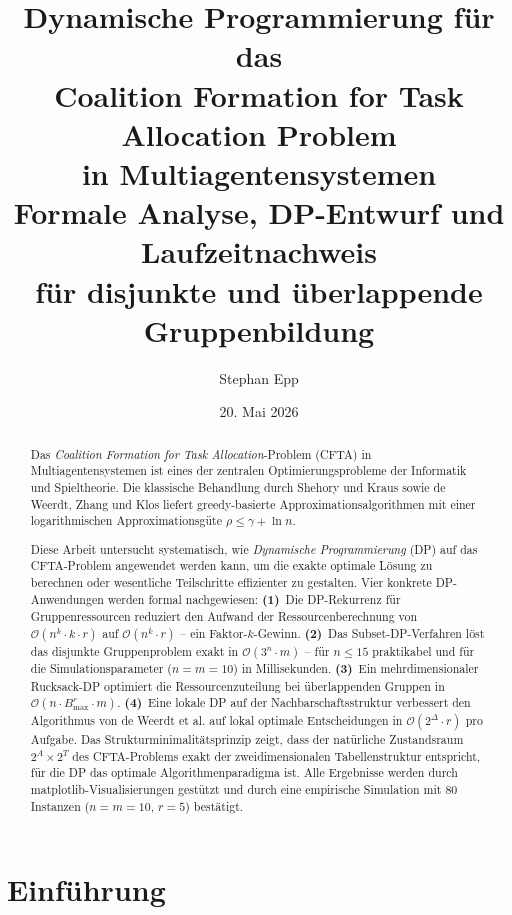 ﻿\documentclass[a4paper,12pt]{article}
\title{\textbf{Dynamische Programmierung f\"{u}r das}\\
\textbf{Coalition Formation for Task Allocation Problem}\\
\textbf{in Multiagentensystemen}\\[6pt]
\large Formale Analyse, DP-Entwurf und Laufzeitnachweis\\
f\"{u}r disjunkte und \"{u}berlappende Gruppenbildung}
\author{Stephan Epp}
\date{20. Mai 2026}
\theoremstyle{definition}
\begin{document}
\maketitle

\begin{abstract}
\noindent
Das \emph{Coalition Formation for Task Allocation}-Problem (CFTA) in
Multiagentensystemen ist eines der zentralen Optimierungsprobleme der
Informatik und Spieltheorie. Die klassische Behandlung durch Shehory
und Kraus \cite{sk98} sowie de Weerdt, Zhang und Klos \cite{dwzk07}
liefert greedy-basierte Approximationsalgorithmen mit einer
logarithmischen Approximationsg\"{u}te $\rho \leq \gamma + \ln n$.

Diese Arbeit untersucht systematisch, wie \emph{Dynamische Programmierung}
(DP) auf das CFTA-Problem angewendet werden kann, um die exakte optimale
L\"{o}sung zu berechnen oder wesentliche Teilschritte effizienter zu gestalten.
Vier konkrete DP-Anwendungen werden formal nachgewiesen:
\textbf{(1)}~Die DP-Rekurrenz f\"{u}r Gruppenressourcen reduziert den Aufwand
der Ressourcenberechnung von $\mathcal{O}(n^k \cdot k \cdot r)$ auf
$\mathcal{O}(n^k \cdot r)$ -- ein Faktor-$k$-Gewinn.
\textbf{(2)}~Das Subset-DP-Verfahren l\"{o}st das disjunkte Gruppenproblem
exakt in $\mathcal{O}(3^n \cdot m)$ -- f\"{u}r $n \leq 15$ praktikabel und
f\"{u}r die Simulationsparameter ($n = m = 10$) in Millisekunden.
\textbf{(3)}~Ein mehrdimensionaler Rucksack-DP optimiert die
Ressourcenzuteilung bei \"{u}berlappenden Gruppen in
$\mathcal{O}(n \cdot B_{\max}^r \cdot m)$.
\textbf{(4)}~Eine lokale DP auf der Nachbarschaftsstruktur verbessert den
Algorithmus von de Weerdt et al. auf lokal optimale Entscheidungen in
$\mathcal{O}(2^\Delta \cdot r)$ pro Aufgabe.
Das Strukturminimalit\"{a}tsprinzip zeigt, dass der nat\"{u}rliche
Zustandsraum $2^A \times 2^T$ des CFTA-Problems exakt der
zweidimensionalen Tabellenstruktur entspricht, f\"{u}r die DP das
optimale Algorithmenparadigma ist.
Alle Ergebnisse werden durch matplotlib-Visualisierungen gest\"{u}tzt und
durch eine empirische Simulation mit 80 Instanzen ($n = m = 10$, $r = 5$)
best\"{a}tigt.
\end{abstract}

\tableofcontents
\newpage

\section{Einf\"{u}hrung}
\end{document}
